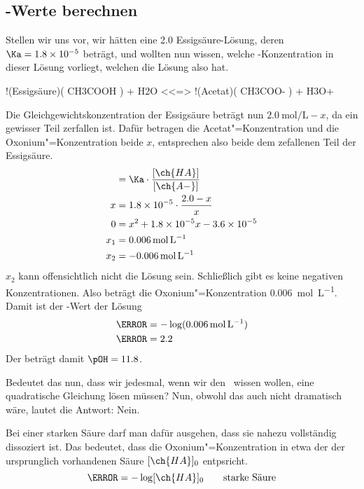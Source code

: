 \documentclass{arbeitsblatt}
\begin{document}
\subsection{\pH-Werte berechnen}
Stellen wir uns vor, wir hätten eine \SI{2.0}{\Molar} Essigsäure-Lösung, deren
$\Ka = \num{1.8e-5}$ beträgt, und wollten nun wissen, welche
-Konzentration in dieser Lösung vorliegt, welchen \pH{} die Lösung also
hat.
\begin{reaction}
  !(Essigsäure)( CH3COOH ) + H2O <<=> !(Acetat)( CH3COO- ) + H3O+
\end{reaction}
Die Gleichgewichtskonzentration der Essigsäure beträgt nun
\(\SI{2.0}{\mole\per\liter}-x\), da ein gewisser Teil zerfallen ist.  Dafür
betragen die Acetat"=Konzentration und die Oxonium"=Konzentration beide \(x\),
entsprechen also beide dem zefallenen Teil der Essigsäure.
\begin{align*}
  [\ch{H3O+}] &= \Ka \cdot \frac{ [\ch{HA}] }{ [\ch{A-}] } \\
  x   &= \num{1.8e-5} \cdot \frac{ 2.0 - x }{ x } \\
  0   &= x^2 +\num{1.8e-5}x - \num{3.6e-5} \\
  x_1 &= \SI{0.006}{\mole\per\liter} \\
  x_2 &= \SI{-0.006}{\mole\per\liter}
\end{align*}
\(x_2\) kann offensichtlich nicht die Lösung sein.  Schließlich gibt es keine
negativen Konzentrationen.  Also beträgt die Oxonium"=Konzentration
\SI{0.006}{\mole\per\liter}.  Damit ist der \pH-Wert der Lösung
\begin{align*}
  \pH &= -\log(\SI{0.006}{\mole\per\liter}) \\
  \pH &= \num{2.2}
\end{align*}
Der \pOH{} beträgt damit \(\pOH = \num{11.8}\).

Bedeutet das nun, dass wir jedesmal, wenn wir den \pH\ wissen wollen, eine
quadratische Gleichung lösen müssen?  Nun, obwohl das auch nicht dramatisch
wäre, lautet die Antwort: Nein.

Bei einer starken Säure darf man dafür ausgehen, dass sie nahezu vollständig
dissoziert ist.  Das bedeutet, dass die Oxonium"=Konzentration in etwa der der
ursprunglich vorhandenen Säure \([\ch{HA}]_0\) entpsricht.
\begin{equation}
  \pH = -\log[\ch{HA}]_0 \qquad \text{starke Säure}
\end{equation}
\end{document}
